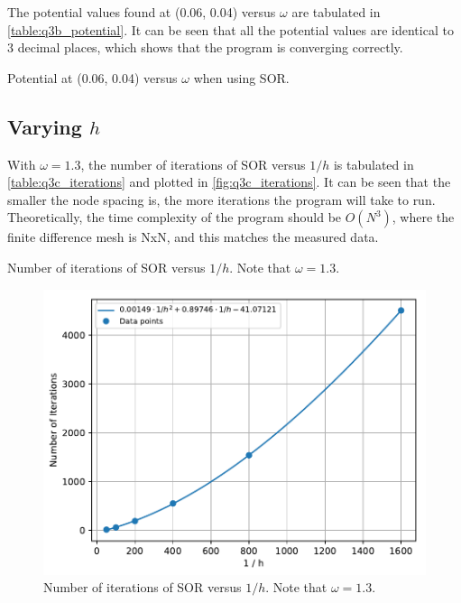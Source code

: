 \documentclass[a4paper,titlepage]{article}
\begin{document}
	The potential values found at (0.06, 0.04) versus $\omega$ are tabulated in \autoref{table:q3b_potential}. It can be seen that all the potential values are identical to 3 decimal places, which shows that the program is converging correctly.

	\begin{table}[!htb]
		\centering
		\caption{Potential at (0.06, 0.04) versus $\omega$ when using SOR.}
		\label{table:q3b_potential}
	\end{table}
	
	\subsection{Varying $h$}
	
	With $\omega = 1.3$, the number of iterations of SOR versus $1/h$ is tabulated in \autoref{table:q3c_iterations} and plotted in \autoref{fig:q3c_iterations}. It can be seen that the smaller the node spacing is, the more iterations the program will take to run. Theoretically, the time complexity of the program should be $O(N^3)$, where the finite difference mesh is NxN, and this matches the measured data.
	
	\begin{table}[!htb]
		\centering
		\caption{Number of iterations of SOR versus $1/h$. Note that $\omega=1.3$.}
		\label{table:q3c_iterations}
	\end{table}
	
	\begin{figure}[!htb]
		\centering
		\includegraphics[width=\columnwidth]{plots/q3c_iterations.pdf}
		\caption
		{Number of iterations of SOR versus $1/h$. Note that $\omega=1.3$.}
		\label{fig:q3c_iterations}
	\end{figure}
\end{document}
